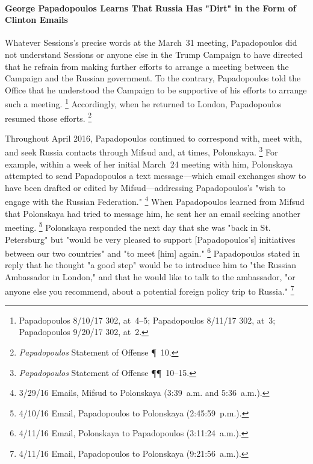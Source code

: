 \paragraph{George Papadopoulos Learns That Russia Has "Dirt" in the Form of Clinton Emails}

Whatever Sessions's precise words at the March~31 meeting, Papadopoulos did not understand Sessions or anyone else in the Trump Campaign to have directed that he refrain from making further efforts to arrange a meeting between the Campaign and the Russian government.
To the contrary, Papadopoulos told the Office that he understood the Campaign to be supportive of his efforts to arrange such a meeting.%
\footnote{Papadopoulos 8/10/17 302, at~4--5; Papadopoulos 8/11/17 302, at~3; Papadopoulos 9/20/17 302, at~2.}
Accordingly, when he returned to London, Papadopoulos resumed those efforts.%
\footnote{\textit{Papadopoulos} Statement of Offense \P~10.}

Throughout April 2016, Papadopoulos continued to correspond with, meet with, and seek Russia contacts through Mifsud and, at times, Polonskaya.%
\footnote{\textit{Papadopoulos} Statement of Offense \P\P~10--15.}
For example, within a week of her initial March~24 meeting with him, Polonskaya attempted to send Papadopoulos a text message---which email exchanges show to have been drafted or edited by Mifsud---addressing Papadopoulos's "wish to engage with the Russian Federation."%
\footnote{3/29/16 Emails, Mifsud to Polonskaya (3:39~a.m. and 5:36~a.m.).}
When Papadopoulos learned from Mifsud that Polonskaya had tried to message him, he sent her an email seeking another meeting.%
\footnote{4/10/16 Email, Papadopoulos to Polonskaya (2:45:59~p.m.).}
Polonskaya responded the next day that she was "back in St. Petersburg" but "would be very pleased to support [Papadopoulos's] initiatives between our two countries" and "to meet [him] again."%
\footnote{4/11/16 Email, Polonskaya to Papadopoulos (3:11:24~a.m.).}
Papadopoulos stated in reply that he thought "a good step" would be to introduce him to "the Russian Ambassador in London," and that he would like to talk to the ambassador, "or anyone else you recommend, about a potential foreign policy trip to Russia."%
\footnote{4/11/16 Email, Papadopoulos to Polonskaya (9:21:56~a.m.).}

